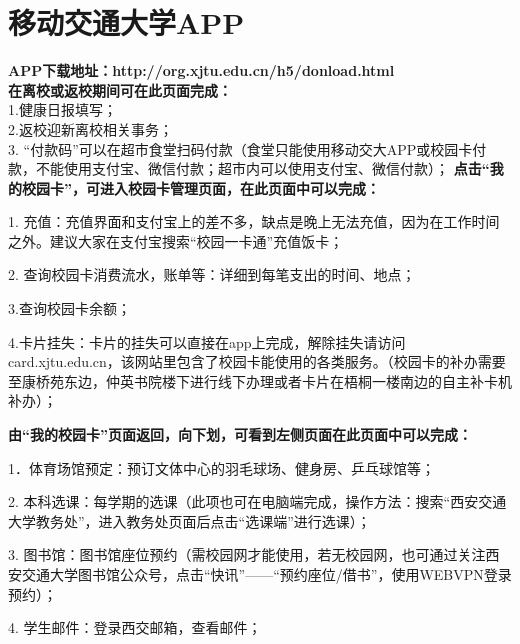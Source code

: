 \documentclass[
decoration,  %
]{qyxf-book}
\newcommand{\Noto}{\CJKfamily{zhsong}}
\begin{document}
\section{移动交通大学APP}
\begin{minipage}[b]{0.6\linewidth}
	\textbf{APP下载地址：http://org.xjtu.edu.cn/h5/donload.html}\\
	\textbf{在离校或返校期间可在此页面完成：}\\
	1.健康日报填写；\\
	2.返校迎新离校相关事务；\\
	3. “付款码”可以在超市食堂扫码付款（食堂只能使用移动交大APP或校园卡付款，不能使用支付宝、微信付款；超市内可以使用支付宝、微信付款）；
	\textbf{点击“我的校园卡”，可进入校园卡管理页面，在此页面中可以完成：}
	
	1. 充值：充值界面和支付宝上的差不多，缺点是晚上无法充值，因为在工作时间之外。建议大家在支付宝搜索“校园一卡通”充值饭卡；
	
	2. 查询校园卡消费流水，账单等：详细到每笔支出的时间、地点；
	
	3.查询校园卡余额；
	
	4.卡片挂失：卡片的挂失可以直接在app上完成，解除挂失请访问card.xjtu.edu.cn，该网站里包含了校园卡能使用的各类服务。（校园卡的补办需要至康桥苑东边，仲英书院楼下进行线下办理或者卡片在梧桐一楼南边的自主补卡机补办）；
	
	\textbf{由“我的校园卡”页面返回，向下划，可看到左侧页面在此页面中可以完成：}
	
	1．体育场馆预定：预订文体中心的羽毛球场、健身房、乒乓球馆等； 
	
    2. 本科选课：每学期的选课（此项也可在电脑端完成，操作方法：搜索“西安交通大学教务处”，进入教务处页面后点击“选课端”进行选课）； 
    
    3. 图书馆：图书馆座位预约（需校园网才能使用，若无校园网，也可通过关注西安交通大学图书馆公众号，点击“\Noto{圕}快讯”——“预约座位/借书”，使用WEBVPN登录预约）； 
    
    4. 学生邮件：登录西交邮箱，查看邮件；

	
\end{minipage}
\hfill
\end{document}

